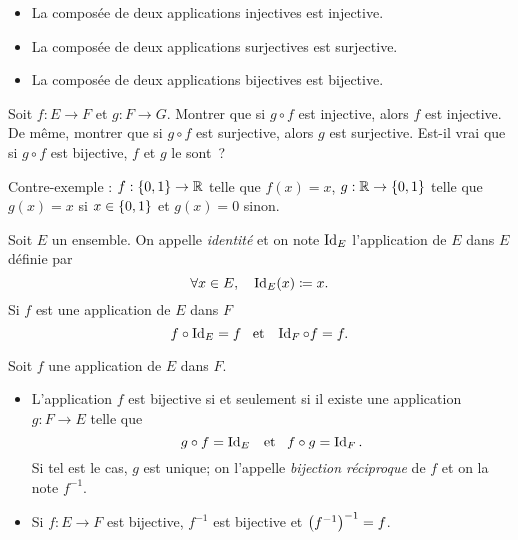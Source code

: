 \documentclass{magnoliaold}
\begin{document}
\begin{proposition}[utile=-3]
\begin{itemize}
\item La composée de deux applications injectives est injective.
\item La composée de deux applications surjectives est surjective.
\item La composée de deux applications bijectives est bijective.
\end{itemize}
\end{proposition}

\begin{exos}
\exo Soit $f:E\to F$ et $g:F\to G$. Montrer que si $g\circ f$ est injective,
  alors $f$ est injective. De même, montrer que si $g\circ f$ est surjective,
  alors $g$ est surjective.
\exo Est-il vrai que si $g\circ f$ est bijective, $f$ et $g$ le sont~?
\begin{sol}
Contre-exemple : $f:\left\{0,1\right\}\to\mathbb{R}$ telle que $f(x)=x$, $g:\mathbb{R}\to\left\{0,1\right\}$ telle que $g(x)=x$ si $x\in \left\{0,1\right\}$ et $g(x)=0$ sinon.
\end{sol}
\end{exos}

\begin{definition}[utile=-3]
Soit $E$ un ensemble. On appelle \emph{identité} et on note $\operatorname{Id}_E$
l'application de $E$ dans $E$ définie par
\[\forall x\in E ,\quad \operatorname{Id}_E(x)\coloneqq x.\]
Si $f$ est une application de $E$ dans $F$
\[f\circ \operatorname{Id}_E=f \quad\!\text{et}\quad\! \operatorname{Id}_F\circ f=f.\]
\end{definition}

\begin{proposition}[utile=-3]
Soit $f$ une application de $E$ dans $F$.
\begin{itemize}
\item L'application $f$ est bijective si et seulement si il existe une
  application $g:F\to E$ telle que
  \[g\circ f=\operatorname{Id}_E \quad\!\text{et}\quad\! f\circ g=\operatorname{Id}_F.\]
  Si tel est le cas, $g$ est unique; on l'appelle \emph{bijection réciproque} de $f$
  et on la note $f^{-1}$.
\item Si $f:E\to F$ est bijective, $f^{-1}$ est bijective et $\left(f^{-1}\right)^{-1}=f$.
\end{itemize}
\end{proposition}
\end{document}
